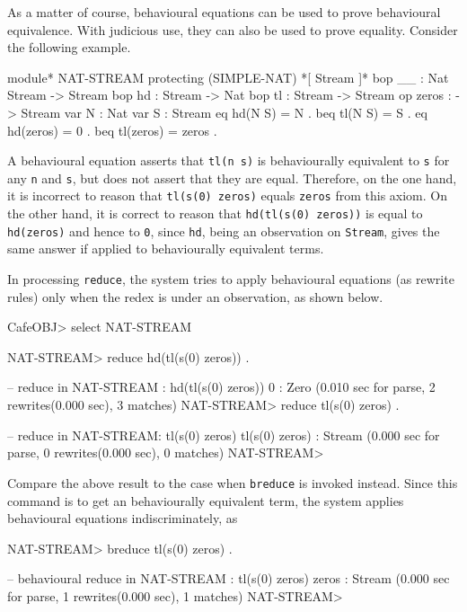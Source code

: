 \documentclass[a4paper]{memoir}
\begin{document}
As a matter of course, behavioural equations can be
used to prove behavioural equivalence. With judicious use, they can also be
used to prove equality. Consider the following example.
\label{exs:nat-stream}
\begin{vvtm}
\begin{ccode}
  module* NAT-STREAM {
    protecting (SIMPLE-NAT)
    *[ Stream ]*
    bop __ : Nat Stream -> Stream
    bop hd : Stream -> Nat
    bop tl : Stream -> Stream
    op zeros : -> Stream
    var N : Nat
    var S : Stream
    eq hd(N S) = N .
    beq tl(N S) = S .
    eq hd(zeros) = 0 .
    beq tl(zeros) = zeros .
  }
\end{ccode}
\end{vvtm}
A behavioural equation asserts that \verb|tl(n s)| is behaviourally
equivalent to \verb|s| for any \verb|n| and \verb|s|, but does not
assert that they are equal. Therefore, on the one hand,
it is incorrect to reason
that \verb|tl(s(0) zeros)| equals \verb|zeros| from this axiom.
On the other hand, it is correct to reason
that \verb|hd(tl(s(0) zeros))| is equal to \verb|hd(zeros)| and hence
to \verb|0|, since \verb|hd|, being an observation on \verb|Stream|,
gives the same answer if applied to behaviourally equivalent terms.

In processing \verb|reduce|, the system tries to apply behavioural
equations (as rewrite rules) only when the redex is under an
observation, as shown below.
\begin{vvtm}
\begin{ccode}
  CafeOBJ> select NAT-STREAM

  NAT-STREAM> reduce hd(tl(s(0) zeros)) .

  -- reduce in NAT-STREAM : hd(tl(s(0) zeros))
  0 : Zero
  (0.010 sec for parse, 2 rewrites(0.000 sec), 3 matches)
  NAT-STREAM> reduce tl(s(0) zeros) .

  -- reduce in NAT-STREAM: tl(s(0) zeros)
  tl(s(0) zeros) : Stream
  (0.000 sec for parse, 0 rewrites(0.000 sec), 0 matches)
  NAT-STREAM> 
\end{ccode}
\end{vvtm}
Compare the above result to the case when \verb|breduce| is
invoked instead. Since this command is to get an behaviourally
equivalent term, the system applies behavioural equations
indiscriminately, as
\begin{vvtm}
\begin{ccode}
  NAT-STREAM> breduce tl(s(0) zeros) .

  -- behavioural reduce in NAT-STREAM : tl(s(0) zeros)
  zeros : Stream
  (0.000 sec for parse, 1 rewrites(0.000 sec), 1 matches)
  NAT-STREAM> 
\end{ccode}
\end{vvtm}
\end{document}
